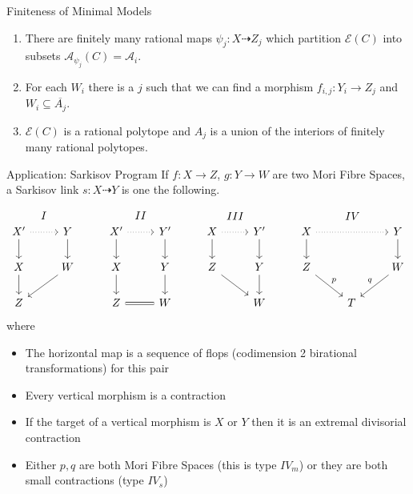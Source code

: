 \documentclass[final]{beamer}
\begin{document}
\begin{frame}[t, fragile]
\begin{columns}[t]
\begin{column}{0.44\paperwidth}
\begin{alertblock}{Finiteness of Minimal Models}
\begin{enumerate}
					\item There are finitely many rational maps $\psi_{j}:X \dashrightarrow Z_{j}$ which partition $\mathcal{E}(C)$ into subsets $\mathcal{A}_{\psi_{j}}(C)=\mathcal{A}_{i}$.
					\item  For each $W_{i}$ there is a $j$ such that we can find a morphism $f_{i,j}: Y_{i} \to Z_{j}$ and $W_{i} \subseteq \overline{A_{j}}$.
					\item  $\mathcal{E}(C)$ is a rational polytope and $A_{j}$ is a union of the interiors of finitely many rational polytopes.
				\end{enumerate}
			\end{alertblock}
			
			\begin{block}{Application: Sarkisov Program}
				If $f:X \to Z$, $g:Y \to W$ are two Mori Fibre Spaces, a Sarkisov link $s:X \dashrightarrow Y$ is one the following.
				
				\[\begin{tikzcd}
				X' \arrow[d] \arrow[r, dotted] \arrow[r, "I", phantom, bend left=49] & Y \arrow[d]  & X' \arrow[r, dotted] \arrow[d] \arrow[r, "II",phantom, bend left=49] & Y' \arrow[d] & X \arrow[r, dotted] \arrow[d] \arrow[r, "III", phantom, bend left=49] & Y' \arrow[d] & X \arrow[d] \arrow[rr, dotted] \arrow[rr, "IV",phantom, bend left] &   & Y \arrow[d]       \\
				X \arrow[d]                                                          & W \arrow[ld] & X \arrow[d]                                               & Y \arrow[d]  & Z \arrow[rd]                                              & Y \arrow[d]  & Z \arrow[rd, "p"]                                          &   & W \arrow[ld, "q"'] \\
				Z                                                                    &              & Z \arrow[r, equal]                                                         & W            &                                                           & W            &                                                            & T &                  
				\end{tikzcd} \]
				where
				\begin{itemize}
					\item The horizontal map is a sequence of flops (codimension 2 birational transformations) for this pair
					\item Every vertical morphism is a contraction
					\item If the target of a vertical morphism is $X$ or $Y$ then it is an extremal divisorial contraction
					\item Either $p,q$ are both Mori Fibre Spaces (this is type $IV_{m}$) or they are both small contractions (type $IV_{s}$)
				\end{itemize}
				

\end{block}
\end{column}
\end{columns}
\end{frame}
\end{document}
